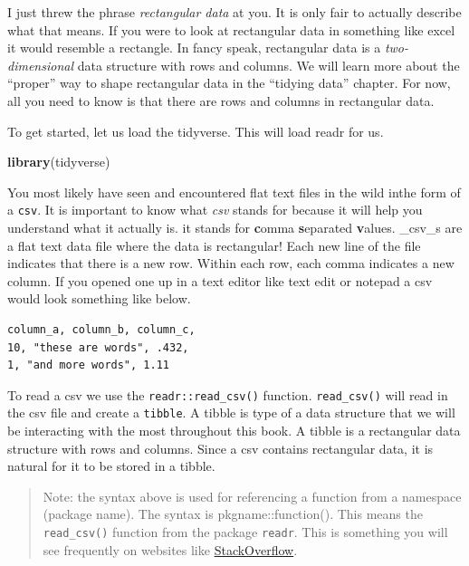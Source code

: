 \documentclass[
]{book}
\newenvironment{Shaded}{\begin{snugshade}}{\end{snugshade}}
\newcommand{\KeywordTok}[1]{\textcolor[rgb]{0.13,0.29,0.53}{\textbf{#1}}}
\newcommand{\NormalTok}[1]{#1}
\begin{document}
I just threw the phrase \emph{rectangular data} at you. It is only fair to actually describe what that means. If you were to look at rectangular data in something like excel it would resemble a rectangle. In fancy speak, rectangular data is a \emph{two-dimensional} data structure with rows and columns. We will learn more about the ``proper'' way to shape rectangular data in the ``tidying data'' chapter. For now, all you need to know is that there are rows and columns in rectangular data.

To get started, let us load the tidyverse. This will load readr for us.

\begin{Shaded}
\begin{Highlighting}[]
\KeywordTok{library}\NormalTok{(tidyverse) }
\end{Highlighting}
\end{Shaded}

You most likely have seen and encountered flat text files in the wild inthe form of a \texttt{csv}. It is important to know what \emph{csv} stands for because it will help you understand what it actually is. it stands for \textbf{c}omma \textbf{s}eparated \textbf{v}alues. \_csv\_s are a flat text data file where the data is rectangular! Each new line of the file indicates that there is a new row. Within each row, each comma indicates a new column. If you opened one up in a text editor like text edit or notepad a csv would look something like below.

\begin{verbatim}
column_a, column_b, column_c,
10, "these are words", .432,
1, "and more words", 1.11
\end{verbatim}

To read a csv we use the \texttt{readr::read\_csv()} function. \texttt{read\_csv()} will read in the csv file and create a \texttt{tibble}. A tibble is type of a data structure that we will be interacting with the most throughout this book. A tibble is a rectangular data structure with rows and columns. Since a csv contains rectangular data, it is natural for it to be stored in a tibble.

\begin{quote}
Note: the syntax above is used for referencing a function from a namespace (package name). The syntax is pkgname::function(). This means the \texttt{read\_csv()} function from the package \texttt{readr}. This is something you will see frequently on websites like \href{https://stackoverflow.com/questions/tagged/r}{StackOverflow}.
\end{quote}
\end{document}

